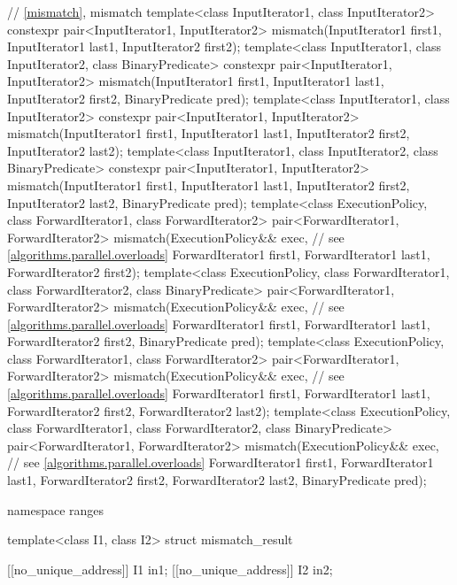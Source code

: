 \begin{codeblock}
{  // \ref{mismatch}, mismatch
  template<class InputIterator1, class InputIterator2>
    constexpr pair<InputIterator1, InputIterator2>
      mismatch(InputIterator1 first1, InputIterator1 last1,
               InputIterator2 first2);
  template<class InputIterator1, class InputIterator2, class BinaryPredicate>
    constexpr pair<InputIterator1, InputIterator2>
      mismatch(InputIterator1 first1, InputIterator1 last1,
               InputIterator2 first2, BinaryPredicate pred);
  template<class InputIterator1, class InputIterator2>
    constexpr pair<InputIterator1, InputIterator2>
      mismatch(InputIterator1 first1, InputIterator1 last1,
               InputIterator2 first2, InputIterator2 last2);
  template<class InputIterator1, class InputIterator2, class BinaryPredicate>
    constexpr pair<InputIterator1, InputIterator2>
      mismatch(InputIterator1 first1, InputIterator1 last1,
               InputIterator2 first2, InputIterator2 last2,
               BinaryPredicate pred);
  template<class ExecutionPolicy, class ForwardIterator1, class ForwardIterator2>
    pair<ForwardIterator1, ForwardIterator2>
      mismatch(ExecutionPolicy&& exec,                          // see \ref{algorithms.parallel.overloads}
               ForwardIterator1 first1, ForwardIterator1 last1,
               ForwardIterator2 first2);
  template<class ExecutionPolicy, class ForwardIterator1, class ForwardIterator2,
           class BinaryPredicate>
    pair<ForwardIterator1, ForwardIterator2>
      mismatch(ExecutionPolicy&& exec,                          // see \ref{algorithms.parallel.overloads}
               ForwardIterator1 first1, ForwardIterator1 last1,
               ForwardIterator2 first2, BinaryPredicate pred);
  template<class ExecutionPolicy, class ForwardIterator1, class ForwardIterator2>
    pair<ForwardIterator1, ForwardIterator2>
      mismatch(ExecutionPolicy&& exec,                          // see \ref{algorithms.parallel.overloads}
               ForwardIterator1 first1, ForwardIterator1 last1,
               ForwardIterator2 first2, ForwardIterator2 last2);
  template<class ExecutionPolicy, class ForwardIterator1, class ForwardIterator2,
           class BinaryPredicate>
    pair<ForwardIterator1, ForwardIterator2>
      mismatch(ExecutionPolicy&& exec,                          // see \ref{algorithms.parallel.overloads}
               ForwardIterator1 first1, ForwardIterator1 last1,
               ForwardIterator2 first2, ForwardIterator2 last2,
               BinaryPredicate pred);

  namespace ranges {
    template<class I1, class I2>
    struct mismatch_result {
      [[no_unique_address]] I1 in1;
      [[no_unique_address]] I2 in2;

}}}
\end{codeblock}
